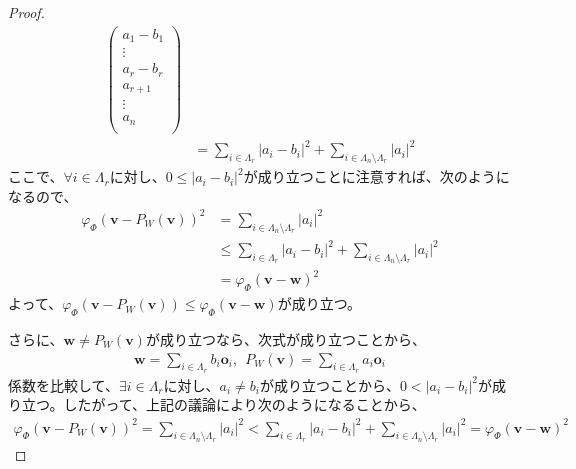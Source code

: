 \documentclass[dvipdfmx]{jsarticle}
\begin{document}
\begin{proof}
\begin{align*}
\begin{pmatrix}
a_{1} - b_{1} \\
 \vdots \\
a_{r} - b_{r} \\
a_{r + 1} \\
 \vdots \\
a_{n} \\
\end{pmatrix}\\
&= \sum_{i \in \varLambda_{r}} \left| a_{i} - b_{i} \right|^{2} + \sum_{i \in \varLambda_{n} \setminus \varLambda_{r}} \left| a_{i} \right|^{2}
\end{align*}
ここで、$\forall i \in \varLambda_{r}$に対し、$0 \leq \left| a_{i} - b_{i} \right|^{2}$が成り立つことに注意すれば、次のようになるので、
\begin{align*}
{\varphi_{\varPhi }\left( \mathbf{v} - P_{W}\left( \mathbf{v} \right) \right)}^{2} &= \sum_{i \in \varLambda_{n} \setminus \varLambda_{r}} \left| a_{i} \right|^{2}\\
&\leq \sum_{i \in \varLambda_{r}} \left| a_{i} - b_{i} \right|^{2} + \sum_{i \in \varLambda_{n} \setminus \varLambda_{r}} \left| a_{i} \right|^{2}\\
&= {\varphi_{\varPhi }\left( \mathbf{v} - \mathbf{w} \right)}^{2}
\end{align*}
よって、$\varphi_{\varPhi }\left( \mathbf{v} - P_{W}\left( \mathbf{v} \right) \right) \leq \varphi_{\varPhi }\left( \mathbf{v} - \mathbf{w} \right)$が成り立つ。\par
さらに、$\mathbf{w} \neq P_{W}\left( \mathbf{v} \right)$が成り立つなら、次式が成り立つことから、
\begin{align*}
\mathbf{w} = \sum_{i \in \varLambda_{r}} {b_{i}\mathbf{o}_{i}},\ \ P_{W}\left( \mathbf{v} \right) = \sum_{i \in \varLambda_{r}} {a_{i}\mathbf{o}_{i}}
\end{align*}
係数を比較して、$\exists i \in \varLambda_{r}$に対し、$a_{i} \neq b_{i}$が成り立つことから、$0 < \left| a_{i} - b_{i} \right|^{2}$が成り立つ。したがって、上記の議論により次のようになることから、
\begin{align*}
{\varphi_{\varPhi }\left( \mathbf{v} - P_{W}\left( \mathbf{v} \right) \right)}^{2} = \sum_{i \in \varLambda_{n} \setminus \varLambda_{r}} \left| a_{i} \right|^{2} < \sum_{i \in \varLambda_{r}} \left| a_{i} - b_{i} \right|^{2} + \sum_{i \in \varLambda_{n} \setminus \varLambda_{r}} \left| a_{i} \right|^{2} = {\varphi_{\varPhi }\left( \mathbf{v} - \mathbf{w} \right)}^{2}
\end{align*}

\end{proof}
\end{document}
